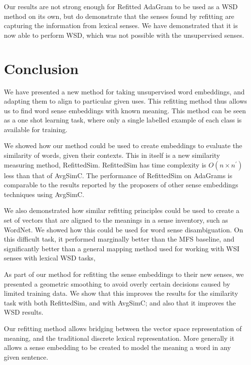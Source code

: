 \documentclass{sig-alternate}
\begin{document}
Our results are not strong enough for Refitted AdaGram to be used as a WSD method on its own, but do demonstrate that the senses found by refitting are capturing the information from lexical senses. We have demonstrated that it is now able to perform WSD, which was not possible with the unsupervised senses. 

\section{Conclusion}\label{conclusion}

We have presented a new method for taking unsupervised word embeddings, and adapting them to align to particular given uses. This refitting method thus allows us to find word sense embeddings with known meaning. This method can be seen as a one shot learning task, where only a single labelled example of each class is available for training.

We showed how our method could be used to create embeddings to evaluate the similarity of words, given their contexts. This in itself is a new similarity measuring method, RefittedSim.  RefittedSim has time complexity is $O(n \times n^\prime)$ less than that of AvgSimC. The performance of RefittedSim on AdaGrams is comparable to the results reported by the proposers of other sense embeddings techniques using AvgSimC.

We also demonstrated how similar refitting principles could be used to create a set of vectors that are aligned to the meanings in a sense inventory, such as WordNet. We showed how this could be used for word sense disambiguation. On this difficult task, it performed marginally better than the MFS baseline, and significantly better than a general mapping method used for working with WSI senses with lexical WSD tasks,

As part of our method for refitting the sense embeddings to their new senses, we presented a geometric smoothing to avoid overly certain decisions caused by limited training data.
We show that this improves the results for the similarity task with both RefittedSim, and with AvgSimC; and also that it improves the WSD results.

Our refitting method allows bridging between the vector space representation of meaning, and the traditional discrete lexical representation. More generally it allows a sense embedding to be created to model the meaning a word in any given sentence.

\newpage
\printbibliography
\end{document}
